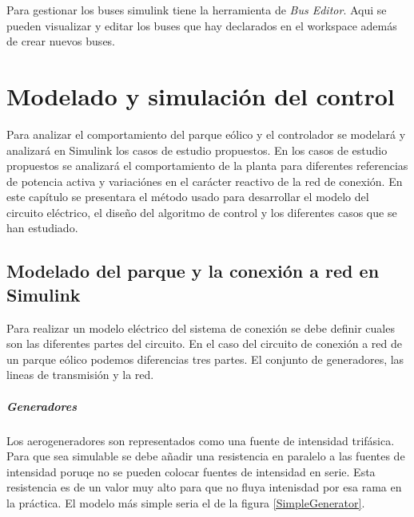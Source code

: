 \documentclass{book}
\begin{document}
Para gestionar los buses simulink tiene la herramienta de \emph{Bus Editor}. Aqui se pueden visualizar y editar los buses que hay declarados en el workspace adem\'as de crear nuevos buses.


\chapter{Modelado y simulaci\'on del control}

Para analizar el comportamiento del parque e\'olico y el controlador se modelar\'a y analizar\'a en Simulink los casos de estudio propuestos. En los casos de estudio propuestos se analizar\'a el comportamiento de la planta para diferentes referencias de potencia activa y variaci\'ones en el car\'acter reactivo de la red de conexi\'on. En este cap\'itulo se presentara el m\'etodo usado para desarrollar el modelo del circuito el\'ectrico, el diseño del algoritmo de control y los diferentes casos que se han estudiado. \par

	\section{Modelado del parque y la conexi\'on a red en Simulink}

Para realizar un modelo el\'ectrico del sistema de conexi\'on se debe definir cuales son las diferentes partes del circuito. En el caso del circuito de conexi\'on a red de un parque e\'olico podemos diferencias tres partes. El conjunto de generadores, las lineas de transmisi\'on y la red. \par 

		\paragraph{Generadores}

Los aerogeneradores son representados como una fuente de intensidad trif\'asica. Para que sea simulable se debe añadir una resistencia en paralelo a las fuentes de intensidad poruqe no se pueden colocar fuentes de intensidad en serie. Esta resistencia es de un valor muy alto para que no fluya intenisdad por esa rama en la pr\'actica. El modelo más simple seria el de la figura \ref{SimpleGenerator}. \par
\end{document}
